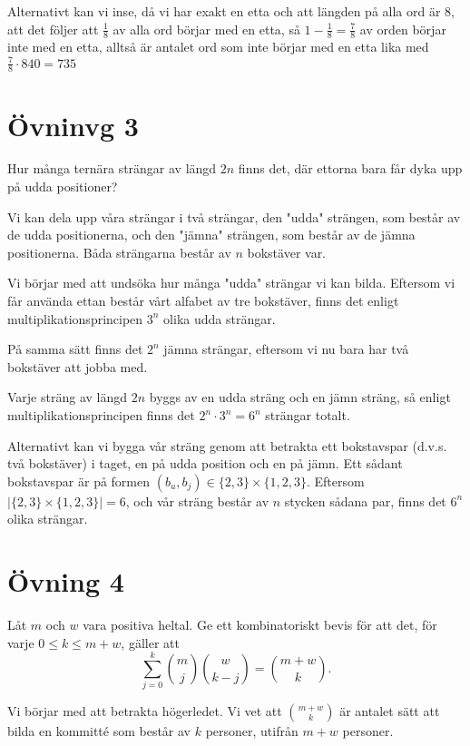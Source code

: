 \documentclass{article}
\begin{document}
Alternativt kan vi inse, då vi har exakt en etta och att längden på alla ord är 8, att det följer att $\frac{1}{8}$ av alla ord börjar med en etta, så $1-\frac{1}{8}=\frac{7}{8}$ av orden börjar inte med en etta, alltså är antalet ord som inte börjar med en etta lika med $\frac{7}{8}\cdot 840=735$

\section*{Övninvg 3}
\begin{xca}
  Hur många ternära strängar av längd $2n$ finns det, där ettorna bara får dyka upp på udda positioner?
\end{xca}

Vi kan dela upp våra strängar i två strängar, den "udda" strängen, som består av de udda positionerna, och den "jämna" strängen, som består av de jämna positionerna. Båda strängarna består av $n$ bokstäver var. 

Vi börjar med att undsöka hur många "udda" strängar vi kan bilda. Eftersom vi får använda ettan består vårt alfabet av tre bokstäver,  finns det enligt multiplikationsprincipen $3^n$ olika udda strängar. 

På samma sätt finns det $2^n$ jämna strängar, eftersom vi nu bara har två bokstäver att jobba med. 

Varje sträng av längd $2n$ byggs av en udda sträng och en jämn sträng, så enligt multiplikationsprincipen finns det $2^n\cdot 3^n=6^n$ strängar totalt. 


Alternativt kan vi bygga vår sträng genom att betrakta ett bokstavspar (d.v.s. två bokstäver) i taget, en på udda position och en på jämn. Ett sådant bokstavspar är på formen $(b_u, b_j)\in \{2, 3\}\times \{1, 2, 3\}$. Eftersom $|\{2, 3\}\times \{1, 2, 3\}|=6$, och vår sträng består av $n$ stycken sådana par, finns det $6^n$ olika strängar. 

\section*{Övning 4}

\begin{xca}
  Låt $m$ och $w$ vara positiva heltal. Ge ett kombinatoriskt bevis för att det, för varje $0 \leq k \leq m + w$, gäller att
  $$\sum_{j=0}^k \binom{m}{j}\binom{w}{k-j} = \binom{m + w}{k}.$$
\end{xca}

Vi börjar med att betrakta högerledet. Vi vet att $m + w \choose k$ är antalet sätt att bilda en kommitté som består av $k$ personer, utifrån $m + w$ personer. 
\end{document}
